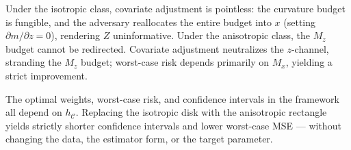 Under the isotropic class, covariate adjustment is pointless: the curvature budget is fungible, and the adversary reallocates the entire budget into $x$ (setting $\partial m / \partial z = 0$), rendering $Z$ uninformative.
Under the anisotropic class, the $M_z$ budget cannot be redirected.
Covariate adjustment neutralizes the $z$-channel, stranding the $M_z$ budget; worst-case risk depends primarily on $M_x$, yielding a strict improvement.

The optimal weights, worst-case risk, and confidence intervals in the \textcite{imbens_optimized_2019} framework all depend on $h_{\mathcal{C}}$.
Replacing the isotropic disk with the anisotropic rectangle yields strictly shorter confidence intervals and lower worst-case MSE --- without changing the data, the estimator form, or the target parameter.

